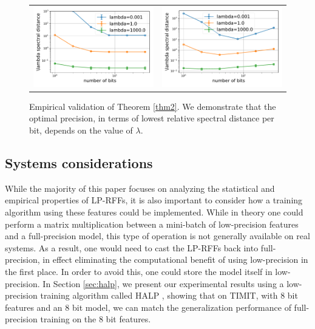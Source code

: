 \begin{figure}
	\centering
	\begin{tabular}{c c}
		\includegraphics[width=0.4\linewidth]{figures/theory_fixed_n_feat.pdf} &
		\includegraphics[width=0.4\linewidth]{figures/theory_fixed_memory.pdf} 
	\end{tabular}
	\caption{Empirical validation of Theorem \ref{thm2}.  We demonstrate that the optimal precision, in terms of lowest relative spectral distance per bit, depends on the value of $\lambda$.}
	\label{fig:theo_validation}
\end{figure}

\subsection{Systems considerations}
While the majority of this paper focuses on analyzing the statistical and empirical properties of LP-RFFs, it is also important to consider how a training algorithm using these features could be implemented. While in theory one could perform a matrix multiplication between a mini-batch of low-precision features and a full-precision model, this type of operation is not generally available on real systems. As a result, one would need to cast the LP-RFFs back into full-precision, in effect eliminating the computational benefit of using low-precision in the first place.  In order to avoid this, one could store the model itself in low-precision. In Section \ref{sec:halp}, we present our experimental results using a low-precision training algorithm called HALP \citep{halp18}, showing that on TIMIT, with 8 bit features and an 8 bit model, we can match the generalization performance of full-precision training on the 8 bit features.


